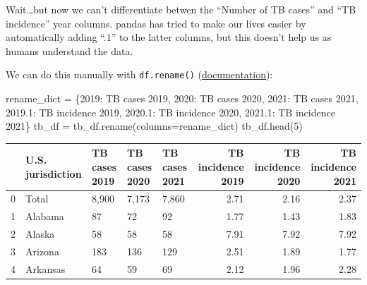\documentclass[
  letterpaper,
  DIV=11,
  numbers=noendperiod]{scrreprt}
\newenvironment{Shaded}{\begin{snugshade}}{\end{snugshade}}
\newcommand{\DecValTok}[1]{\textcolor[rgb]{0.68,0.00,0.00}{#1}}
\newcommand{\NormalTok}[1]{\textcolor[rgb]{0.00,0.23,0.31}{#1}}
\newcommand{\OperatorTok}[1]{\textcolor[rgb]{0.37,0.37,0.37}{#1}}
\newcommand{\StringTok}[1]{\textcolor[rgb]{0.13,0.47,0.30}{#1}}
\begin{document}
Wait\ldots but now we can't differentiate betwen the ``Number of TB
cases'' and ``TB incidence'' year columns. pandas has tried to make our
lives easier by automatically adding ``.1'' to the latter columns, but
this doesn't help us as humans understand the data.

We can do this manually with \texttt{df.rename()}
(\href{https://pandas.pydata.org/docs/reference/api/pandas.DataFrame.rename.html?highlight=rename\#pandas.DataFrame.rename}{documentation}):

\begin{Shaded}
\begin{Highlighting}[]
\NormalTok{rename\_dict }\OperatorTok{=}\NormalTok{ \{}\StringTok{\textquotesingle{}2019\textquotesingle{}}\NormalTok{: }\StringTok{\textquotesingle{}TB cases 2019\textquotesingle{}}\NormalTok{,}
               \StringTok{\textquotesingle{}2020\textquotesingle{}}\NormalTok{: }\StringTok{\textquotesingle{}TB cases 2020\textquotesingle{}}\NormalTok{,}
               \StringTok{\textquotesingle{}2021\textquotesingle{}}\NormalTok{: }\StringTok{\textquotesingle{}TB cases 2021\textquotesingle{}}\NormalTok{,}
               \StringTok{\textquotesingle{}2019.1\textquotesingle{}}\NormalTok{: }\StringTok{\textquotesingle{}TB incidence 2019\textquotesingle{}}\NormalTok{,}
               \StringTok{\textquotesingle{}2020.1\textquotesingle{}}\NormalTok{: }\StringTok{\textquotesingle{}TB incidence 2020\textquotesingle{}}\NormalTok{,}
               \StringTok{\textquotesingle{}2021.1\textquotesingle{}}\NormalTok{: }\StringTok{\textquotesingle{}TB incidence 2021\textquotesingle{}}\NormalTok{\}}
\NormalTok{tb\_df }\OperatorTok{=}\NormalTok{ tb\_df.rename(columns}\OperatorTok{=}\NormalTok{rename\_dict)}
\NormalTok{tb\_df.head(}\DecValTok{5}\NormalTok{)}
\end{Highlighting}
\end{Shaded}

\begin{tabular}{lllllrrr}
\toprule
{} & U.S. jurisdiction & TB cases 2019 & TB cases 2020 & TB cases 2021 &  TB incidence 2019 &  TB incidence 2020 &  TB incidence 2021 \\
\midrule
0 &             Total &         8,900 &         7,173 &         7,860 &               2.71 &               2.16 &               2.37 \\
1 &           Alabama &            87 &            72 &            92 &               1.77 &               1.43 &               1.83 \\
2 &            Alaska &            58 &            58 &            58 &               7.91 &               7.92 &               7.92 \\
3 &           Arizona &           183 &           136 &           129 &               2.51 &               1.89 &               1.77 \\
4 &          Arkansas &            64 &            59 &            69 &               2.12 &               1.96 &               2.28 \\
\bottomrule
\end{tabular}
\end{document}
